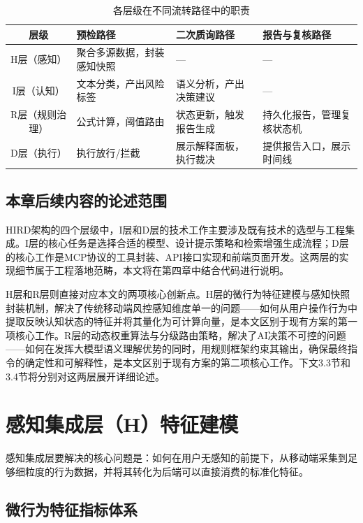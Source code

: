 \documentclass[twoside,openright]{xduugthesis}
\begin{document}
\begin{table}[H]
    \centering
    \caption{各层级在不同流转路径中的职责}
    \label{tab:layer-responsibility}
    \begin{tabular}{|c|p{3cm}|p{3cm}|p{3cm}|}
        \hline
        层级 & 预检路径 & 二次质询路径 & 报告与复核路径 \\
        \hline
        H层（感知） & 聚合多源数据，封装感知快照 & — & — \\
        \hline
        I层（认知） & 文本分类，产出风险标签 & 语义分析，产出决策建议 & — \\
        \hline
        R层（规则治理） & 公式计算，阈值路由 & 状态更新，触发报告生成 & 持久化报告，管理复核状态机 \\
        \hline
        D层（执行） & 执行放行/拦截 & 展示解释面板，执行裁决 & 提供报告入口，展示时间线 \\
        \hline
    \end{tabular}
\end{table}

\subsection{本章后续内容的论述范围}

HIRD架构的四个层级中，I层和D层的技术工作主要涉及既有技术的选型与工程集成。I层的核心任务是选择合适的模型、设计提示策略和检索增强生成流程；D层的核心工作是MCP协议的工具封装、API接口实现和前端页面开发。这两层的实现细节属于工程落地范畴，本文将在第四章中结合代码进行说明。

H层和R层则直接对应本文的两项核心创新点。H层的微行为特征建模与感知快照封装机制，解决了传统移动端风控感知维度单一的问题——如何从用户操作行为中提取反映认知状态的特征并将其量化为可计算向量，是本文区别于现有方案的第一项核心工作。R层的动态权重算法与分级路由策略，解决了AI决策不可控的问题——如何在发挥大模型语义理解优势的同时，用规则框架约束其输出，确保最终指令的确定性和可解释性，是本文区别于现有方案的第二项核心工作。下文3.3节和3.4节将分别对这两层展开详细论述。

\section{感知集成层（H）特征建模}

感知集成层要解决的核心问题是：如何在用户无感知的前提下，从移动端采集到足够细粒度的行为数据，并将其转化为后端可以直接消费的标准化特征。

\subsection{微行为特征指标体系}
\end{document}
